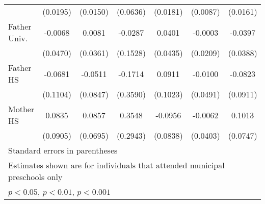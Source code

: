 \begin{table}[htbp]
\begin{tabular}{l*{6}{c}}
            &    (0.0195)         &    (0.0150)         &    (0.0636)         &    (0.0181)         &    (0.0087)         &    (0.0161)         \\
\addlinespace
Father Univ.&     -0.0068         &      0.0081         &     -0.0287         &      0.0401         &     -0.0003         &     -0.0397         \\
            &    (0.0470)         &    (0.0361)         &    (0.1528)         &    (0.0435)         &    (0.0209)         &    (0.0388)         \\
\addlinespace
Father HS   &     -0.0681         &     -0.0511         &     -0.1714         &      0.0911         &     -0.0100         &     -0.0823         \\
            &    (0.1104)         &    (0.0847)         &    (0.3590)         &    (0.1023)         &    (0.0491)         &    (0.0911)         \\
\addlinespace
Mother HS   &      0.0835         &      0.0857         &      0.3548         &     -0.0956         &     -0.0062         &      0.1013         \\
            &    (0.0905)         &    (0.0695)         &    (0.2943)         &    (0.0838)         &    (0.0403)         &    (0.0747)         \\
\bottomrule
\multicolumn{7}{l}{\footnotesize Standard errors in parentheses}\\
\multicolumn{7}{l}{\footnotesize Estimates shown are for individuals that attended municipal preschools only}\\
\multicolumn{7}{l}{\footnotesize \sym{*} \(p<0.05\), \sym{**} \(p<0.01\), \sym{***} \(p<0.001\)}\\
\end{tabular}
\end{table}
